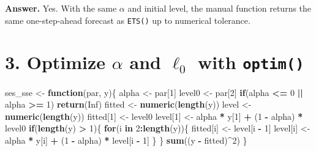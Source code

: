 \documentclass[
  11pt,
]{article}
\newenvironment{Shaded}{\begin{snugshade}}{\end{snugshade}}
\newcommand{\ConstantTok}[1]{\textcolor[rgb]{0.56,0.35,0.01}{#1}}
\newcommand{\ControlFlowTok}[1]{\textcolor[rgb]{0.13,0.29,0.53}{\textbf{#1}}}
\newcommand{\DecValTok}[1]{\textcolor[rgb]{0.00,0.00,0.81}{#1}}
\newcommand{\FunctionTok}[1]{\textcolor[rgb]{0.13,0.29,0.53}{\textbf{#1}}}
\newcommand{\NormalTok}[1]{#1}
\newcommand{\OtherTok}[1]{\textcolor[rgb]{0.56,0.35,0.01}{#1}}
\newcommand{\SpecialCharTok}[1]{\textcolor[rgb]{0.81,0.36,0.00}{\textbf{#1}}}
\begin{document}
\textbf{Answer.} Yes. With the same \(\alpha\) and initial level, the
manual function returns the same one-step-ahead forecast as
\texttt{ETS()} up to numerical tolerance.

\section{\texorpdfstring{3. Optimize \(\alpha\) and \(\ell_0\) with
\texttt{optim()}}{3. Optimize \textbackslash alpha and \textbackslash ell\_0 with optim()}}\label{optimize-alpha-and-ell_0-with-optim}

\begin{Shaded}
\begin{Highlighting}[]
\NormalTok{ses\_sse }\OtherTok{\textless{}{-}} \ControlFlowTok{function}\NormalTok{(par, y)\{}
\NormalTok{  alpha }\OtherTok{\textless{}{-}}\NormalTok{ par[}\DecValTok{1}\NormalTok{]}
\NormalTok{  level0 }\OtherTok{\textless{}{-}}\NormalTok{ par[}\DecValTok{2}\NormalTok{]}
  \ControlFlowTok{if}\NormalTok{(alpha }\SpecialCharTok{\textless{}=} \DecValTok{0} \SpecialCharTok{||}\NormalTok{ alpha }\SpecialCharTok{\textgreater{}=} \DecValTok{1}\NormalTok{) }\FunctionTok{return}\NormalTok{(}\ConstantTok{Inf}\NormalTok{)}
\NormalTok{  fitted }\OtherTok{\textless{}{-}} \FunctionTok{numeric}\NormalTok{(}\FunctionTok{length}\NormalTok{(y))}
\NormalTok{  level }\OtherTok{\textless{}{-}} \FunctionTok{numeric}\NormalTok{(}\FunctionTok{length}\NormalTok{(y))}
\NormalTok{  fitted[}\DecValTok{1}\NormalTok{] }\OtherTok{\textless{}{-}}\NormalTok{ level0}
\NormalTok{  level[}\DecValTok{1}\NormalTok{] }\OtherTok{\textless{}{-}}\NormalTok{ alpha }\SpecialCharTok{*}\NormalTok{ y[}\DecValTok{1}\NormalTok{] }\SpecialCharTok{+}\NormalTok{ (}\DecValTok{1} \SpecialCharTok{{-}}\NormalTok{ alpha) }\SpecialCharTok{*}\NormalTok{ level0}
  \ControlFlowTok{if}\NormalTok{(}\FunctionTok{length}\NormalTok{(y) }\SpecialCharTok{\textgreater{}} \DecValTok{1}\NormalTok{)\{}
    \ControlFlowTok{for}\NormalTok{(i }\ControlFlowTok{in} \DecValTok{2}\SpecialCharTok{:}\FunctionTok{length}\NormalTok{(y))\{}
\NormalTok{      fitted[i] }\OtherTok{\textless{}{-}}\NormalTok{ level[i }\SpecialCharTok{{-}} \DecValTok{1}\NormalTok{]}
\NormalTok{      level[i] }\OtherTok{\textless{}{-}}\NormalTok{ alpha }\SpecialCharTok{*}\NormalTok{ y[i] }\SpecialCharTok{+}\NormalTok{ (}\DecValTok{1} \SpecialCharTok{{-}}\NormalTok{ alpha) }\SpecialCharTok{*}\NormalTok{ level[i }\SpecialCharTok{{-}} \DecValTok{1}\NormalTok{]}
\NormalTok{    \}}
\NormalTok{  \}}
  \FunctionTok{sum}\NormalTok{((y }\SpecialCharTok{{-}}\NormalTok{ fitted)}\SpecialCharTok{\^{}}\DecValTok{2}\NormalTok{)}
\NormalTok{\}}


\end{Highlighting}
\end{Shaded}
\end{document}
